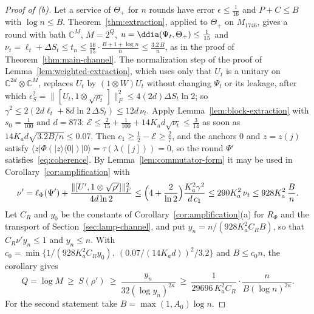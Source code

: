 \begin{proof}[Proof of (b)]
Let a service of $\Theta_+$ for $n$ rounds have error $\epsilon\le\frac1{16}$ and $P+C\le B$ with $\log n\le B$. Theorem~\ref{thm:extraction},
applied to $\Theta_+$ on $M_{1746}$, gives a round with bath $\mathbb C^M$, $M=2^Q$, $u=\ddia(\Psi_t,\Theta_+)\le\frac1{15}$ and
$\nu_t=\ell_t+\Delta S_t\le t_n\le\frac{16}{15}\cdot\frac{B+1+\log n}n\le\frac{3.2\,B}n$, as in the proof of Theorem~\ref{thm:main-channel}. The normalization
step of the proof of Lemma~\ref{lem:weighted-extraction}, which uses only that $U_t$ is a unitary on $\mathbb C^{2d}\otimes\mathbb C^M$, replaces $U_t$ by
$(1\otimes W)U_t$ without changing $\Psi_t$ or its leakage, after which $\epsilon_S^2=\|[U_t,1\otimes\sqrt{\rho_t}\,]\|_F^2\le4(2d)\Delta S_t\ln2$; so
$\gamma^2\le2(2d\ell_t+8d\ln2\,\Delta S_t)\le12d\,\nu_t$. Apply Lemma~\ref{lem:block-extraction} with $s_0=\frac1{100}$ and $d=873$:
$\mathcal E\le\frac2{15}+\frac1{100}+14K_ad\sqrt{\nu_t}\le\frac3{14}$ as soon as $14K_ad\sqrt{3.2B/n}\le0.07$. Then $c_1\ge\frac12-\mathcal E\ge\frac27$, and the anchors $0$
and $z=z(j)$ satisfy $\langle z|\Phi(|z\rangle\langle0|)|0\rangle=\tau(\lambda([j]))=0$, so the round $\Psi'$ satisfies~\eqref{eq:coherence}. By
Lemma~\ref{lem:commutator-form} it may be used in Corollary~\ref{cor:amplification} with
\[
\nu'=\ell_\Phi(\Psi')+\frac{\|[U',1\otimes\sqrt{\rho'}]\|_F^2}{4d\ln2}\le\Bigl(4+\frac2{\ln2}\Bigr)\frac{K_a^2\gamma^2}{d\,c_1}\le290K_a^2\,\nu_t\le928K_a^2\,\frac Bn .
\]
Let $C_R$ and $y_0$ be the constants of Corollary~\ref{cor:amplification}(a) for $R_\Phi$ and the transport of Section~\ref{sec:lamp-channel}, and put
$y_n=n/(928K_a^2C_RB)$, so that $C_R\nu'y_n\le1$ and $y_n\le n$. With
$c_0=\min\{1/(928K_a^2C_Ry_0),\ (0.07/(14K_ad))^2/3.2\}$ and $B\le c_0n$, the corollary gives
\[
Q=\log M\ \ge\ S(\rho')\ \ge\ \frac{y_n}{32(\log y_n)^{2\kappa}}\ \ge\ \frac1{29696\,K_a^2C_R}\cdot\frac n{B(\log n)^{2\kappa}} .
\]
For the second statement take $B=\max(1,A_0)\log n$.
\end{proof}

